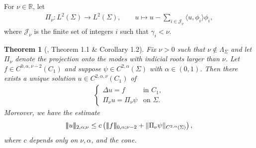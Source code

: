 \documentclass[11pt]{amsart}
\DeclarePairedDelimiter{\tnorm}{\vert\!\vert\!\vert}{\vert\!\vert\!\vert}
\newtheorem{theorem}{Theorem}
\theoremstyle{definition}
\theoremstyle{remark}
\begin{document}
For $\nu\in \mathbb{R}$, let
\begin{align}\label{eq: def-projection-Pi}
    \Pi_\nu: L^2(\Sigma)\to L^2(\Sigma), \qquad u\mapsto u-\sum_{i\in \mathcal{J}_\nu}\langle u,\phi_i\rangle\phi_i,
\end{align}
where $\mathcal{J}_\nu$ is the finite set of integers $i$ such that $\gamma_i<\nu$.
\begin{theorem}[\cite{CHS}, Theorem 1.1 \& Corollary 1.2]\label{thm: CHS-linear}
Fix \(\nu>0\) such that $\nu \notin \Lambda_\Sigma$
and let \(\Pi_\nu\) denote the projection onto the modes with indicial roots
larger than \(\nu\). Let $f\in C^{0,\alpha,\nu-2}(C_1)$ and suppose $\psi\in C^{2,\alpha}(\Sigma)$ with
$\alpha\in (0,1)$.
Then there exists a unique solution \(u\in C^{2,\alpha,\nu}(C_{1})\) of
\begin{align}\label{eq:dirichlet-u}
\begin{cases}
    \Delta u=f & \text{in } C_{1},\\
    \Pi_\nu u=\Pi_\nu\psi & \text{on } \Sigma.
\end{cases}
\end{align}
Moreover, we have the estimate
\[
    \tnorm{u}_{2,\alpha;\nu}
    \leq
    c\left(
       \tnorm{f}_{0,\alpha;\nu-2}
        +
        \|\Pi_\nu\psi\|_{C^{2,\alpha}(\Sigma)}
    \right),
\]
where \(c\) depends only on \(\nu,\alpha\), and the cone. 
\end{theorem}
\end{document}
